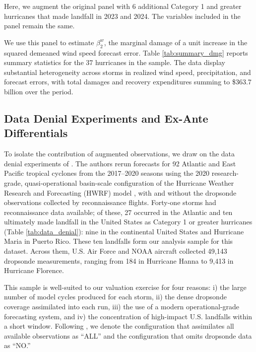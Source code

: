 \documentclass[12pt]{article}%
\begin{document}
Here, we augment the original panel with 6 additional Category 1 and greater hurricanes that made landfall in 2023 and 2024. The variables included in the panel remain the same. 

We use this panel to estimate $\beta^{w}_{2}$, the marginal damage of a unit increase in the squared demeaned wind speed forecast error. Table \ref{tab:summary_dmg} reports summary statistics for the 37 hurricanes in the sample. The data display substantial heterogeneity across storms in realized wind speed, precipitation, and forecast errors, with total damages and recovery expenditures summing to \$363.7 billion over the period.



\subsection{Data Denial Experiments and Ex-Ante Differentials}

To isolate the contribution of augmented observations, we draw on the data denial experiments of \citet{DitchekEA2023}. The authors rerun forecasts for 92 Atlantic and East Pacific tropical cyclones from the 2017--2020 seasons using the 2020 research-grade, quasi-operational basin-scale configuration of the Hurricane Weather Research and Forecasting (HWRF) model \citep{ZhangEA2016,AlakaEA2022}, with and without the dropsonde observations collected by reconnaissance flights. Forty-one storms had reconnaissance data available; of these, 27 occurred in the Atlantic and ten ultimately made landfall in the United States as Category 1 or greater hurricanes (Table \ref{tab:data_denial}): nine in the continental United States and Hurricane Maria in Puerto Rico. These ten landfalls form our analysis sample for this dataset. Across them, U.S. Air Force and NOAA aircraft collected 49,143 dropsonde measurements, ranging from 184 in Hurricane Hanna to 9,413 in Hurricane Florence.



This sample is well-suited to our valuation exercise for four reasons: i) the large number of model cycles produced for each storm, ii) the dense dropsonde coverage assimilated into each run, iii) the use of a modern operational-grade forecasting system, and iv) the concentration of high-impact U.S. landfalls within a short window. Following \citet{DitchekEA2023}, we denote the configuration that assimilates all available observations as ``ALL'' and the configuration that omits dropsonde data as ``NO.''
\end{document}
